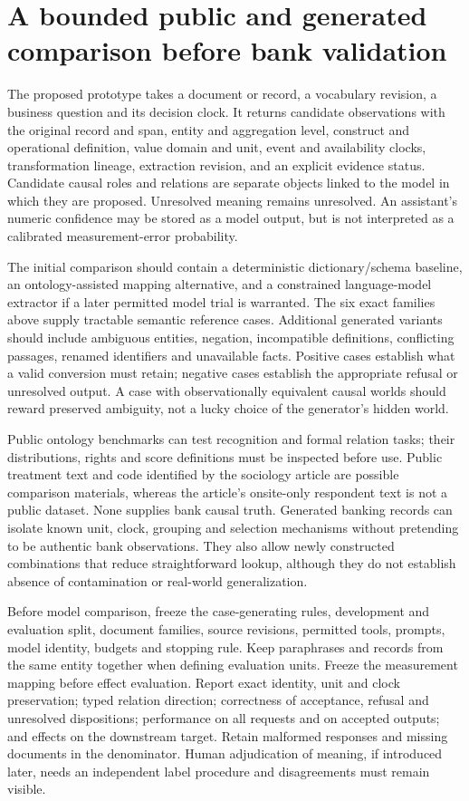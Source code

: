\section{A bounded public and generated comparison before bank validation}

The proposed prototype takes a document or record, a vocabulary revision, a
business question and its decision clock. It returns candidate observations
with the original record and span, entity and aggregation level, construct and
operational definition, value domain and unit, event and availability clocks,
transformation lineage, extraction revision, and an explicit evidence status.
Candidate causal roles and relations are separate objects linked to the
model in which they are proposed. Unresolved meaning remains unresolved.
An assistant's numeric confidence may be stored as a model output, but is
not interpreted as a calibrated measurement-error probability.
\citep{exec17_ontology_contract}

The initial comparison should contain a deterministic dictionary/schema
baseline, an ontology-assisted mapping alternative, and a constrained
language-model extractor if a later permitted model trial is warranted.
The six exact families above supply tractable semantic reference cases.
Additional generated variants should include ambiguous entities, negation,
incompatible definitions, conflicting passages, renamed identifiers and
unavailable facts. Positive cases establish what a valid conversion must
retain; negative cases establish the appropriate refusal or unresolved
output. A case with observationally equivalent causal worlds should reward
preserved ambiguity, not a lucky choice of the generator's hidden world.

Public ontology benchmarks can test recognition and formal relation tasks;
their distributions, rights and score definitions must be inspected before
use. Public treatment text and code identified by the sociology article are
possible comparison materials, whereas the article's onsite-only respondent
text is not a public dataset. None supplies bank causal truth. Generated
banking records can isolate known unit, clock, grouping and selection
mechanisms without pretending to be authentic bank observations. They also
allow newly constructed combinations that reduce straightforward lookup,
although they do not establish absence of contamination or real-world
generalization.

Before model comparison, freeze the case-generating rules, development and
evaluation split, document families, source revisions, permitted tools,
prompts, model identity, budgets and stopping rule. Keep paraphrases and
records from the same entity together when defining evaluation units. Freeze
the measurement mapping before effect evaluation. Report exact identity,
unit and clock preservation; typed relation direction; correctness of
acceptance, refusal and unresolved dispositions; performance on all requests
and on accepted outputs; and effects on the downstream target. Retain
malformed responses and missing documents in the denominator. Human
adjudication of meaning, if introduced later, needs an independent label
procedure and disagreements must remain visible.

